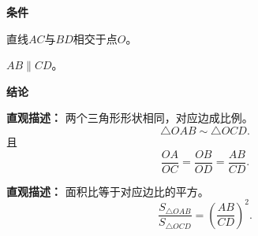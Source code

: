 \begin{statementbox}
	\textbf{\textcolor{CStatement}{条件}}
	\begin{description}[style=nextline, leftmargin=2.8em, labelsep=0.5em, itemsep=0.35em]
		\item[\textbf{\textcolor{CStatement}{条件1（相交直线）：}}]
			直线$AC$与$BD$相交于点$O$。
		\item[\textbf{\textcolor{CStatement}{条件2（平行条件）：}}]
			$AB\parallel CD$。
	\end{description}
	\par\textbf{\textcolor{CStatement}{结论}}
	\begin{description}[style=nextline, leftmargin=2.8em, labelsep=0.5em, itemsep=0.45em]
		\item[\textbf{\textcolor{CStatement}{结论一（三角形相似）：}}]
			\textbf{\textcolor{CStatement}{直观描述：}}
			两个三角形形状相同，对应边成比例。
			\[
				\triangle OAB\sim\triangle OCD.
			\]
			且
			\[
				\frac{OA}{OC}=\frac{OB}{OD}=\frac{AB}{CD}.
			\]
		\item[\textbf{\textcolor{CStatement}{推广结论（面积关系）：}}]
			\textbf{\textcolor{CStatement}{直观描述：}}
			面积比等于对应边比的平方。
			\[
				\frac{S_{\triangle OAB}}{S_{\triangle OCD}}=\left(\frac{AB}{CD}\right)^2.
			\]
	\end{description}

\end{statementbox}
